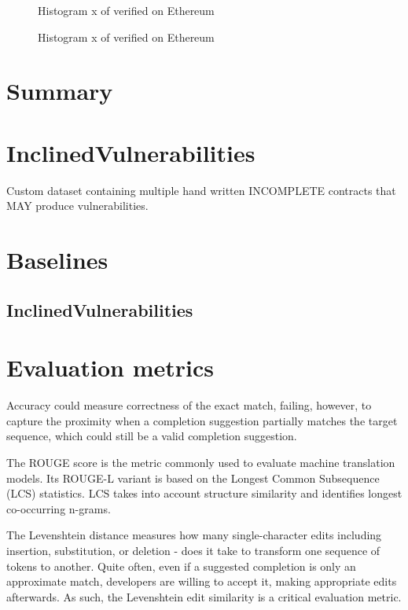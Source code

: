 \begin{figure}[ht]
    \centering
    
    \caption{Histogram \small x of verified  on Ethereum}
\end{figure}


\begin{figure}[ht]
    \centering
    
    \caption{Histogram \small x of verified  on Ethereum}
\end{figure}



\section{Summary}






\section{InclinedVulnerabilities}

Custom dataset containing multiple hand written INCOMPLETE contracts that MAY produce vulnerabilities.


\section{Baselines}
\subsection{InclinedVulnerabilities}

\section{Evaluation metrics}
Accuracy could measure correctness of the exact match, failing, however, to capture the proximity when a completion suggestion partially matches the target sequence, which could still be a valid completion suggestion.

The ROUGE score is the metric commonly used to evaluate machine translation models. Its ROUGE-L variant is based on the Longest Common Subsequence (LCS) statistics. LCS takes into account structure similarity and identifies longest co-occurring n-grams.

The Levenshtein distance measures how many single-character edits  including insertion, substitution, or deletion - does it take to transform one sequence of tokens to another. Quite often, even if a suggested completion is only an approximate match, developers are willing to accept it, making appropriate edits afterwards. As such, the Levenshtein edit similarity is a critical evaluation metric.


